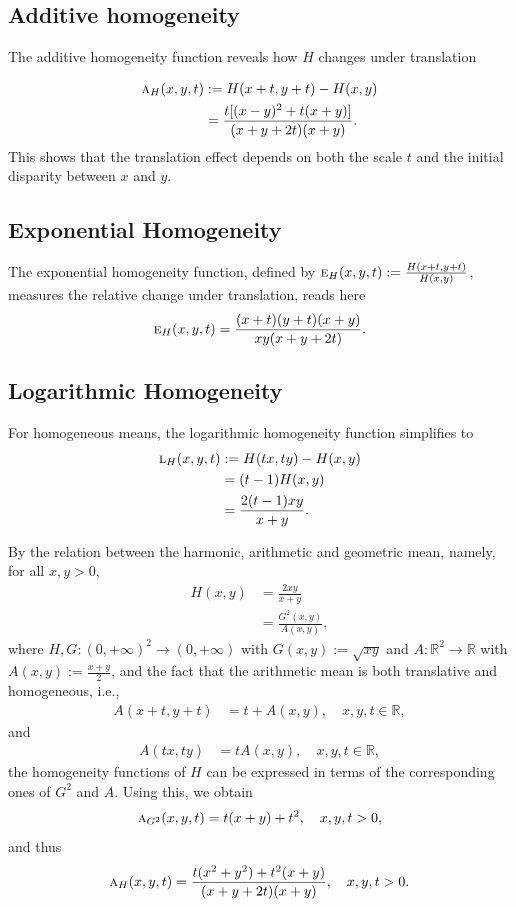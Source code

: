 \documentclass{amsart}
\theoremstyle{plain}
\numberwithin{equation}{section}
\newcommand{\ah}{\textsc{a}}
\newcommand{\eh}{\textsc{e}}
\newcommand{\R}{{\mathbb{R}}}
\begin{document}
\subsection{Additive homogeneity}
The additive homogeneity function 
reveals how $H$ changes under translation

\begin{align*}
\textsc{a}_H(x,y,t) &:= H(x+t,y+t) - H(x,y) \\
&= \frac{t[(x-y)^2 + t(x+y)]}{(x+y+2t)(x+y)}.
\end{align*}
This shows that the translation effect depends on both the scale $t$ and the initial disparity between $x$ and $y$.

\subsection{Exponential Homogeneity}
The exponential homogeneity function, 
defined by
$\eh_H (x,y,t):=\frac{H(x+t, y+t)}{H(x,y)}$,
measures the relative change under translation,
reads here
\begin{align*}
	\eh_H (x,y,t)=\frac{(x+t)(y+t)(x+y)}{xy(x+y+2t)}.
\end{align*}

\subsection{Logarithmic Homogeneity}
For homogeneous means, the logarithmic homogeneity function simplifies to
\begin{align*}
\textsc{l}_H(x,y,t) &:= H(tx,ty) - H(x,y) \\
&= (t-1)H(x,y)\\
&= \frac{2(t-1)xy}{x+y}.
\end{align*}

By the relation between the harmonic, arithmetic and geometric mean, 
namely, for all $x,y >0$,
\begin{align*}
H(x,y) &= \frac{2 xy}{x+y}\\
&= \frac{G^2(x,y)}{A(x,y)},
\end{align*}
where
$H, G: (0, + \infty)^2 \to (0, + \infty)$ 
with $G(x,y):=\sqrt{xy}$ and $A:\R^2 \to \R$ with $A(x,y):=\frac{x+y}{2}$,
and the fact that the arithmetic mean is both translative and homogeneous, 
i.e.,
\begin{align*}
A(x+t, y+t) &= t+ A(x,y), \quad x,y,t \in \R,
\end{align*}
and 
\begin{align*}
A(tx, ty) &= t A(x,y), \quad x,y,t \in \R,
\end{align*}
the homogeneity functions of $H$ can be expressed in terms of the corresponding ones of $G^2$ and $A$.
Using this, we obtain
\begin{align*}
 \ah_{G^2}(x,y,t) = t(x+y)+t^2, \quad x,y,t >0,
\end{align*}
and thus
\begin{align*}
 \ah_{H} (x,y,t) = \frac{t(x^2+y^2) +t^2 (x+y)}{(x+y+2t) (x+y)}, \quad x,y,t >0.
\end{align*}
\end{document}
